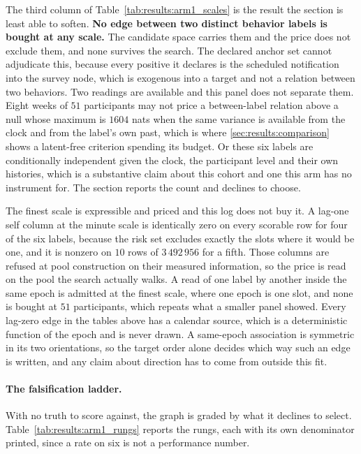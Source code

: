 The third column of Table~\ref{tab:results:arm1_scales} is the result the
section is least able to soften. \textbf{No edge between two distinct behavior
labels is bought at any scale.} The candidate space carries them and the price
does not exclude them, and none survives the search. The declared anchor set
cannot adjudicate this,
because every positive it declares is the scheduled notification into the survey
node, which is exogenous into a target and not a relation between two behaviors.
Two readings are available and this panel does not separate them. Eight weeks of
$51$ participants may not price a between-label relation above a null whose
maximum is $1604$ nats when the same variance is available from the clock and
from the label's own past, which is where
\cref{sec:results:comparison} shows a latent-free criterion spending its budget.
Or these six labels are conditionally independent given the clock, the
participant level and their own histories, which is a substantive claim about
this cohort and one this arm has no instrument for. The section reports the
count and declines to choose.

The finest scale is expressible and priced and this log does not buy it. A
lag-one self column at the minute scale is identically zero on every scorable
row for four of the six labels, because the risk set excludes exactly the slots
where it would be one, and it is nonzero on $10$ rows of $3\,492\,956$ for a
fifth. Those columns are refused at pool construction on their measured
information, so the price is read on the pool the search actually walks.
A read of one label by another inside the same epoch is admitted at the finest
scale, where one epoch is one slot, and none is bought at $51$ participants,
which repeats what a smaller panel showed. Every lag-zero edge in the tables
above has a calendar source, which is a deterministic function of the epoch and
is never drawn. A same-epoch association is symmetric in its two orientations, so the
target order alone decides which way such an edge is written, and any claim
about direction has to come from outside this fit.

\paragraph{The falsification ladder.}
With no truth to score against, the graph is graded by what it declines to
select. Table~\ref{tab:results:arm1_rungs} reports the rungs, each with its own
denominator printed, since a rate on six is not a performance number.

